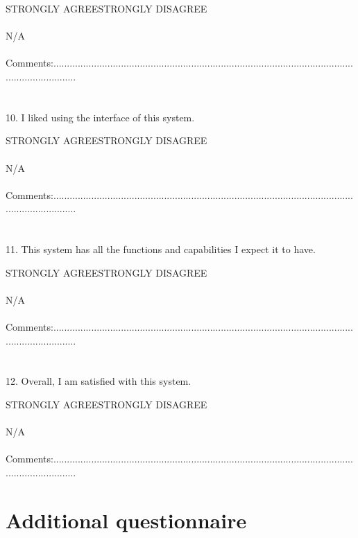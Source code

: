 \begin{appendix}
{STRONGLY AGREE\tab\tab\tab\tab\tab STRONGLY DISAGREE\\
\\
\tab\tab N/A\\
\\
Comments:.........................................................................................................................................\\
\\
\\
10. I liked using the interface of this system.

STRONGLY AGREE\tab\tab\tab\tab\tab STRONGLY DISAGREE\\
\\
\tab\tab N/A\\
\\
Comments:.........................................................................................................................................\\
\\
\\
11. This system has all the functions and capabilities I expect it to have.

STRONGLY AGREE\tab\tab\tab\tab\tab STRONGLY DISAGREE\\
\\
\tab\tab N/A\\
\\
Comments:.........................................................................................................................................\\
\\
\\
12. Overall, I am satisfied with this system.

STRONGLY AGREE\tab\tab\tab\tab\tab STRONGLY DISAGREE\\
\\
\tab\tab N/A\\
\\
Comments:.........................................................................................................................................

\newpage
\section{Additional questionnaire}


}
\end{appendix}
